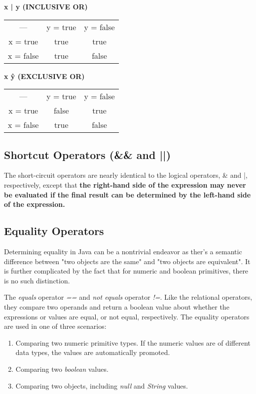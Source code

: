 \documentclass{article}
\begin{document}
\textbf{x | y (INCLUSIVE OR)}
\begin{tabular}{|c|c|c|}
	\cline{1-3}
	--- & y = true & y = false \\
	\cline{1-3}
	x = true & true & true \\
	\cline{1-3}
	x = false & true & false \\
	\cline{1-3}
\end{tabular}

\textbf{x \^ y (EXCLUSIVE OR)}
\begin{tabular}{|c|c|c|}
	\cline{1-3}
	--- & y = true & y = false \\
	\cline{1-3}
	x = true & false & true \\
	\cline{1-3}
	x = false & true & false \\
	\cline{1-3}
\end{tabular}
\subsection{Shortcut Operators (\&\& and ||)}
The short-circuit operators are nearly identical to the logical operators, \& and |, respectively, except that \textbf{the right-hand side of the expression may never be evaluated if the final result can be determined by the left-hand side of the expression.}

\subsection{Equality Operators}
Determining equality in Java can be a nontrivial endeavor as ther's a semantic difference between "two objects are the same" and "two objects are equivalent". It is further complicated by the fact that for numeric and boolean primitives, there is no such distinction.

The \emph{equals} operator \emph{==} and \emph{not equals} operator \emph{!=}. Like the relational operators, they compare two operands and return a boolean value about whether the expressions or values are equal, or not equal, respectively.
The equality operators are used in one of three scenarios:
\begin{enumerate}
	\item Comparing two numeric primitive types. If the numeric values are of different data types, the values are automatically promoted.
	\item Comparing two \emph{boolean} values.
	\item Comparing two objects, including \emph{null} and \emph{String} values.
\end{enumerate}
\end{document}
